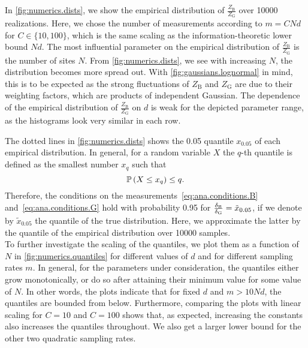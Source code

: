In \cref{fig:numerics.dists}, we show the empirical distribution of $\frac{Z_\mathrm{{B}}}{Z_\mathrm{G}}$ over 10000 realizations.
Here, we chose the number of measurements according to $m = C N d$ for $C \in \{10, 100\}$, which is the same scaling as the information-theoretic lower bound $N d$.
The most influential parameter on the empirical distribution of $\frac{Z_\mathrm{{B}}}{Z_\mathrm{G}}$ is the number of sites $N$.
From \cref{fig:numerics.dists}, we see with increasing $N$, the distribution becomes more spread out.
With \cref{fig:gaussians.lognormal} in mind, this is to be expected as the strong fluctuations of $Z_\mathrm{B}$ and $Z_\mathrm{G}$ are due to their weighting factors, which are products of independent Gaussian.
The dependence of the empirical distribution of $\frac{Z_\mathrm{{B}}}{Z_\mathrm{G}}$ on $d$ is weak for the depicted parameter range, as the histograms look very similar in each row.

The dotted lines in \cref{fig:numerics.dists} shows the 0.05 quantile $x_{0.05}$ of each empirical distribution.
In general, for a random variable $X$ the $q$-th quantile is defined as the smallest number $x_{q}$ such that
\[
  \label{eq:numerics.quantile}
  \mathbb{P}\left( X \le x_{q} \right) \le q.
\]
Therefore, the conditions on the measurements~\eqref{eq:ana.conditions.B} and~\eqref{eq:ana.conditions.G} hold with probability 0.95 for $\frac{\delta_\mathrm{B}}{\delta_\mathrm{G}} = \tilde x_{0.05}$, if we denote by $\tilde x_{0.05}$ the quantile of the true distribution.
Here, we approximate the latter by the quantile of the empirical distribution over 10000 samples.\\



To further investigate the scaling of the quantiles, we plot them as a function of $N$ in \cref{fig:numerics.quantiles} for different values of $d$ and for different sampling rates $m$.
In general, for the parameters under consideration, the quantiles either grow monotonically, or do so after attaining their minimum value for some value of $N$.
In other words, the plots indicate that for fixed $d$ and $m > 10 N d$, the quantiles are bounded from below.
Furthermore, comparing the plots with linear scaling for $C = 10$ and $C = 100$ shows that, as expected, increasing the constants also increases the quantiles throughout.
We also get a larger lower bound for the other two quadratic sampling rates.


